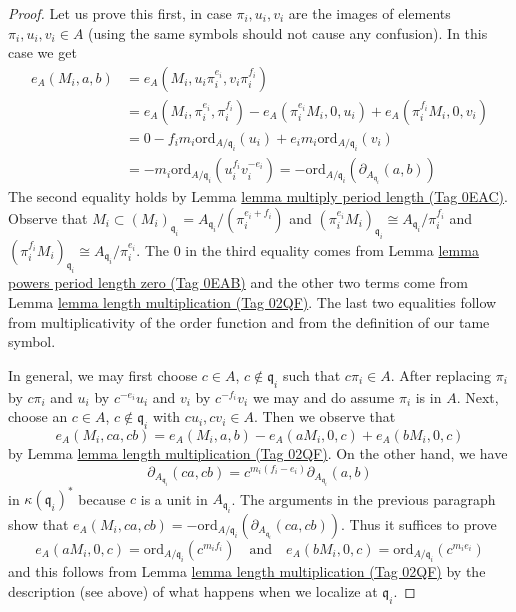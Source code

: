 \documentclass{amsart}
\theoremstyle{plain}
\theoremstyle{definition}
\theoremstyle{remark}
\numberwithin{equation}{subsection}
\begin{document}
\begin{proof}
\medskip\noindent
Let us prove this first, in case $\pi_i, u_i, v_i$ are the images
of elements $\pi_i, u_i, v_i \in A$ (using the same symbols
should not cause any confusion). In this case we get
\begin{align*}
e_A(M_i, a, b) & =
e_A(M_i, u_i\pi_i^{e_i}, v_i\pi_i^{f_i}) \\
& =
e_A(M_i, \pi_i^{e_i}, \pi_i^{f_i}) -
e_A(\pi_i^{e_i}M_i, 0, u_i) +
e_A(\pi_i^{f_i}M_i, 0, v_i) \\
& =
0 -
f_im_i\text{ord}_{A/\mathfrak q_i}(u_i) +
e_im_i\text{ord}_{A/\mathfrak q_i}(v_i) \\
& =
-m_i\text{ord}_{A/\mathfrak q_i}(u_i^{f_i}v_i^{-e_i}) =
-\text{ord}_{A/\mathfrak q_i}(\partial_{A_{\mathfrak q_i}}(a, b))
\end{align*}
The second equality holds by Lemma \href{https://stacks.math.columbia.edu/tag/0EAC}{lemma multiply period length (Tag 0EAC)}.
Observe that
$M_i \subset (M_i)_{\mathfrak q_i} = A_{\mathfrak q_i}/(\pi_i^{e_i + f_i})$
and
$(\pi_i^{e_i}M_i)_{\mathfrak q_i} \cong A_{\mathfrak q_i}/\pi_i^{f_i}$ and
$(\pi_i^{f_i}M_i)_{\mathfrak q_i} \cong A_{\mathfrak q_i}/\pi_i^{e_i}$.
The $0$ in the third equality comes from
Lemma \href{https://stacks.math.columbia.edu/tag/0EAB}{lemma powers period length zero (Tag 0EAB)}
and the other two terms come from
Lemma \href{https://stacks.math.columbia.edu/tag/02QF}{lemma length multiplication (Tag 02QF)}.
The last two equalities follow from multiplicativity of
the order function and from the definition of our tame symbol.

\medskip\noindent
In general, we may first choose $c \in A$, $c \not \in \mathfrak q_i$
such that $c\pi_i \in A$. After replacing $\pi_i$ by $c\pi_i$
and $u_i$ by $c^{-e_i}u_i$ and $v_i$ by $c^{-f_i}v_i$
we may and do assume $\pi_i$ is in $A$.
Next, choose an $c \in A$, $c \not \in \mathfrak q_i$
with $cu_i, cv_i \in A$. Then we observe that
$$
e_A(M_i, ca, cb) = e_A(M_i, a, b) - e_A(aM_i, 0, c) + e_A(bM_i, 0, c)
$$
by Lemma \href{https://stacks.math.columbia.edu/tag/02QF}{lemma length multiplication (Tag 02QF)}.
On the other hand, we have
$$
\partial_{A_{\mathfrak q_i}}(ca, cb) =
c^{m_i(f_i - e_i)}\partial_{A_{\mathfrak q_i}}(a, b)
$$
in $\kappa(\mathfrak q_i)^*$ because $c$ is a unit in $A_{\mathfrak q_i}$.
The arguments in the previous paragraph show that
$e_A(M_i, ca, cb) = -
\text{ord}_{A/\mathfrak q_i}(\partial_{A_{\mathfrak q_i}}(ca, cb))$.
Thus it suffices to prove
$$
e_A(aM_i, 0, c) = \text{ord}_{A/\mathfrak q_i}(c^{m_if_i})
\quad\text{and}\quad
e_A(bM_i, 0, c) = \text{ord}_{A/\mathfrak q_i}(c^{m_ie_i})
$$
and this follows from Lemma \href{https://stacks.math.columbia.edu/tag/02QF}{lemma length multiplication (Tag 02QF)}
by the description (see above)
of what happens when we localize at $\mathfrak q_i$.
\end{proof}
\end{document}
